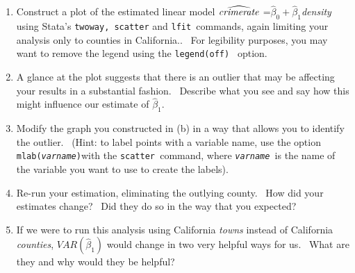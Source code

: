 \documentclass[11pt]{article}
\begin{document}
\begin{enumerate}
\begin{enumerate}
\item Construct a plot of the estimated linear model $\widehat{\mathit{%
crimerate}}$ =$\widehat{\beta }_{0}+\widehat{\beta }_{1}$\textit{density}
using Stata's \texttt{twoway, scatter} and \texttt{lfit }commands, again
limiting your analysis only to counties in California.. \ For legibility
purposes, you may want to remove the legend using the \texttt{legend(off) }%
option.

\item A glance at the plot suggests that there is an outlier that may be
affecting your results in a substantial fashion. \ Describe what you see and
say how this might influence our estimate of $\widehat{\beta }_{1}.$

\item Modify the graph you constructed in (b) in a way that allows you to
identify the outlier. \ (Hint: to label points with a variable name, use the
option \texttt{mlab(\textit{varname})}with the \texttt{scatter }command,
where \texttt{\textit{varname}}\textit{\ }is the name of the variable you
want to use to create the labels).

\item Re-run your estimation, eliminating the outlying county. \ How did
your estimates change? \ Did they do so in the way that you expected?

\item If we were to run this analysis using California \textit{towns}
instead of California \textit{counties}, $VAR\left( \widehat{\beta }%
_{1}\right) $ would change in two very helpful ways for us. \ What are they
and why would they be helpful?
\end{enumerate}
\end{enumerate}
\end{document}
